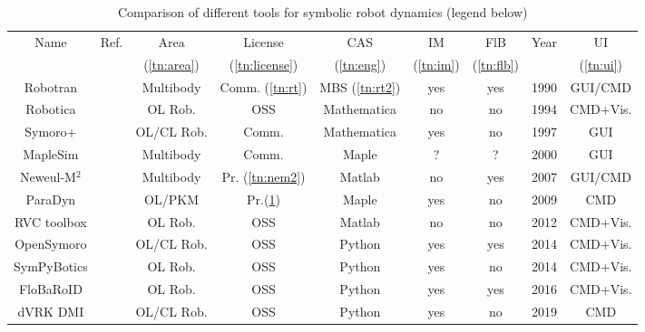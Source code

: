 \documentclass[runningheads]{llncs}
\newcommand{\ok}{{yes}}
\newcommand{\no}{{no}}
\begin{document}
\begin{table}[b!] %
	\vspace{-0.3cm}
	\caption{Comparison of different tools for symbolic robot dynamics (legend below)}
	\vspace{-0.3cm}
	\label{tab:comparison}
	\centering
	\begin{tabular}[t]{|c|c|c|c|c|c|c|c|c|}
		\hline
		Name & Ref. & Area & License & CAS & IM  & FlB & Year & UI \\
		&&\tabnote{}\label{tn:area} (\ref{tn:area})&\tabnote{}\label{tn:license} (\ref{tn:license})&\tabnote{}\label{tn:eng} (\ref{tn:eng})&\tabnote{}\label{tn:im} (\ref{tn:im})&\tabnote{}\label{tn:flb} (\ref{tn:flb})&&\tabnote{}\label{tn:ui} (\ref{tn:ui})\\
		\hline
		Robotran & \cite{Docquier2013} & Multibody & Comm.\tabnote{}\label{tn:rt} (\ref{tn:rt}) &  MBS\tabnote{}\label{tn:rt2} (\ref{tn:rt2}) & \ok & \ok & 1990 & GUI/CMD \\
		\hline
		Robotica & \cite{NetherySpo1994} & OL Rob. & OSS & Mathematica & \no & \no & 1994 & CMD+Vis. \\
		\hline
		Symoro+ & \cite{KhalilCre1997} & OL/CL Rob. & Comm. & Mathematica & \ok & \no & 1997 & GUI \\
		\hline
		MapleSim & \cite{MapleSim} & Multibody & Comm. & Maple & ? & ? & 2000 & GUI \\
		\hline
		Neweul-M$^2$ & \cite{KurzEbeHenSch2010} & Multibody & Pr. \tabnote{}\label{tn:nem2}(\ref{tn:nem2}) & Matlab & \no & \ok & 2007 & GUI/CMD \\
		\hline
		ParaDyn & \cite{DoThanhKotHeiOrt2009b} & OL/PKM & Pr.\tabnote{}\label{tn:pd} (\ref{tn:pd}) & Maple & \ok & \no & 2009 & CMD \\
		\hline
		RVC toolbox & \cite{Corke2011} & OL Rob. & OSS & Matlab & \no & \no & 2012 & CMD+Vis. \\
		\hline
		OpenSymoro & \cite{KhalilVijKhoMuk2014} & OL/CL Rob. & OSS & Python & \ok & \ok & 2014 & CMD+Vis. \\
		\hline
		SymPyBotics & \cite{SousaCor2012} & OL Rob. & OSS & Python & \ok & \no & 2014 & CMD+Vis. \\
		\hline
		FloBaRoID & \cite{BethgeMalTsaCal2017} & OL Rob. & OSS & Python & \ok & \ok & 2016 & CMD+Vis. \\
		\hline
		dVRK DMI & \cite{WangGonMunFis2019} & OL/CL Rob. & OSS & Python & \ok & \no & 2019 & CMD \\
		\hline

\end{tabular}
\end{table}
\end{document}
